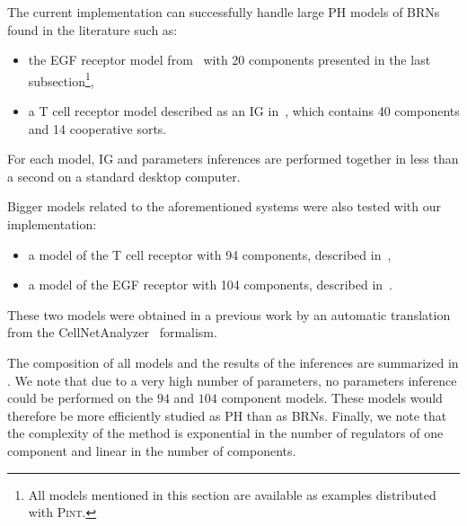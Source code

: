 The current implementation can successfully handle large PH models of BRNs found in the literature such as:
\begin{itemize}
  \item the EGF receptor model from~\cite{Sahin09} with 20 components presented in the last
    subsection\footnote{All models mentioned in this section are available as examples distributed with \textsc{Pint}.},
  \item a T cell receptor model described as an IG in~\cite{Klamt06}, which contains 40 components and 14 cooperative sorts.
\end{itemize}
For each model, IG and parameters inferences are performed together in less than a second
on a standard desktop computer.

Bigger models related to the aforementioned systems were also tested with our implementation:
\begin{itemize}
  \item a model of the T cell receptor with 94 components, described in~\cite{SaezRodriguez2007},
  \item a model of the EGF receptor with 104 components, described in~\cite{Samaga2009}.
\end{itemize}
These two models were obtained in a previous work by an automatic translation from the CellNetAnalyzer~\cite{klamt2007structural} formalism.

The composition of all models and the results of the inferences are summarized in .
We note that due to a very high number of parameters, no parameters inference could be performed on the $94$ and $104$ component models.
These models would therefore be more efficiently studied as PH than as BRNs.
Finally, we note that the complexity of the method is exponential in the number of regulators of one
component and linear in the number of components.

